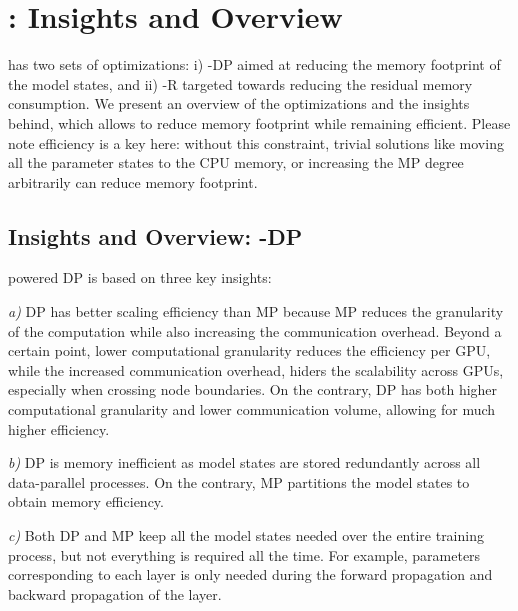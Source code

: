 
\section{\name: Insights and Overview}
 \name has two sets of optimizations: i) \name-DP aimed at reducing the memory footprint of the model states, and ii) \name-R targeted towards reducing the residual memory consumption.  We present an overview of the optimizations and the insights behind, which allows \name to reduce memory footprint while remaining efficient. Please note efficiency is a key here: without this constraint, trivial solutions like moving all the parameter states to the CPU memory, or  increasing the MP degree arbitrarily can reduce memory footprint.   
\begin{comment}Now that we know where all the memory goes, how can we reduce the memory footprint and use it effectively without sacrificing efficiency?  Our solution, for reducing memory footprint without sacrificing efficiency is based on three sets of insights. 
\end{comment}

\subsection{Insights and Overview: \name-DP}
\name powered DP is based on three key insights:

{\it a)} DP has better scaling efficiency than MP because MP reduces the granularity of the computation while also increasing the communication overhead. Beyond a certain point, lower computational granularity reduces the efficiency per GPU, while the increased communication overhead, hiders the scalability across GPUs, especially when crossing node boundaries. On the contrary, DP has both higher computational granularity and lower communication volume, allowing for much higher efficiency.

{\it b)} DP is memory inefficient as model states are stored redundantly across all data-parallel processes. On the contrary, MP partitions the model states to obtain memory efficiency.

{\it c)} Both DP and MP keep all the model states needed over the entire training process, but not everything is required all the time.  For example, parameters corresponding to each layer is only needed during the forward propagation and backward propagation of the layer. %

